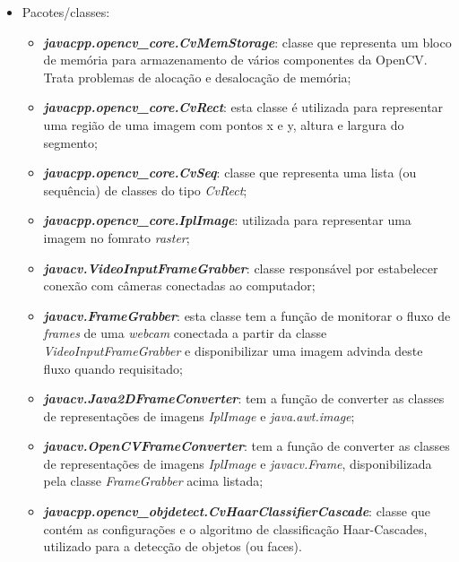\begin{itemize}
	\item Pacotes/classes:
	\begin{itemize}
		\item \textit{\textbf{javacpp.opencv\_core.CvMemStorage}}: classe que representa um bloco de memória para armazenamento de vários componentes da OpenCV. Trata problemas de alocação e desalocação de memória;
		
		\item \textbf{\textit{javacpp.opencv\_core.CvRect}}: esta classe é utilizada para representar uma região de uma imagem com pontos x e y, altura e largura do segmento;
		
		\item \textbf{\textit{javacpp.opencv\_core.CvSeq}}: classe que representa uma lista (ou sequência) de classes do tipo \textit{CvRect};
		
		\item \textbf{\textit{javacpp.opencv\_core.IplImage}}: utilizada para representar uma imagem no fomrato \textit{raster};
		
		\item \textbf{\textit{javacv.VideoInputFrameGrabber}}:	classe responsável por estabelecer conexão com câmeras conectadas ao computador;

		\item \textbf{\textit{javacv.FrameGrabber}}: esta classe tem a função de monitorar o fluxo de \textit{frames} de uma \textit{webcam} conectada a partir da classe \textit{VideoInputFrameGrabber} e disponibilizar uma imagem advinda deste fluxo quando requisitado;		
			
		\item \textbf{\textit{javacv.Java2DFrameConverter}}: tem a função de converter as classes de representações de imagens \textit{IplImage} e \textit{java.awt.image};
		
		\item \textbf{\textit{javacv.OpenCVFrameConverter}}: tem a função de converter as classes de representações de imagens \textit{IplImage} e \textit{javacv.Frame}, disponibilizada pela classe \textit{FrameGrabber} acima listada;
		
		\item \textbf{\textit{javacpp.opencv\_objdetect.CvHaarClassifierCascade}}: classe que contém as configurações e o algoritmo de classificação Haar-Cascades, utilizado para a detecção de objetos (ou faces).
	\end{itemize}


\end{itemize}
